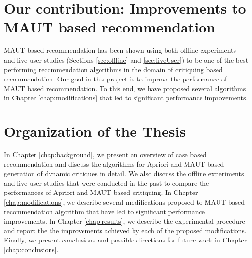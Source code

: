 \section{Our contribution: Improvements to MAUT based recommendation}
MAUT based recommendation has been shown using both offline experiments and live user studies (Sections \ref{sec:offline} and \ref{sec:liveUser}) to be one of the best performing recommendation algorithms in the domain of critiquing based recommendation.
Our goal in this project is to improve the performance of MAUT based recommendation.
To this end, we have proposed several algorithms in Chapter \ref{chap:modifications} that led to significant performance improvements.

\section{Organization of the Thesis}
In Chapter \ref{chap:background}, we present an overview of case based recommendation and discuss the algorithms for Apriori and  MAUT based generation of dynamic critiques in detail. We also discuss the offline experiments and live user studies that were conducted in the past to compare the performances of Apriori and MAUT based critiquing.
In Chapter \ref{chap:modifications}, we describe several modifications proposed to MAUT based recommendation algorithm that have led to significant performance improvements.
In Chapter \ref{chap:results}, we describe the experimental procedure and report the the improvements achieved by each of the proposed modifications.
Finally, we present conclusions and possible directions for future work in Chapter \ref{chap:conclusions}.
